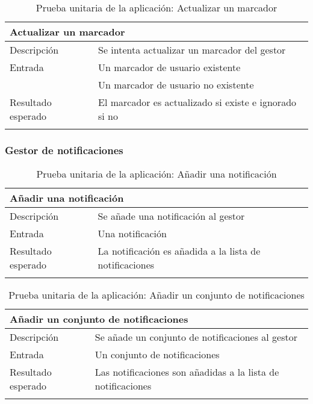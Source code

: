 \begin{longtable}{|p{} p{}|}
    \hline
    \multicolumn{2}{|l|}{\textbf{Actualizar un marcador}} \\ \hline 
    Descripción                 & Se intenta actualizar un marcador del gestor \\ \hline
    Entrada                     & Un marcador de usuario existente \\
                                & Un marcador de usuario no existente \\\hline
    Resultado esperado          & El marcador es actualizado si existe e ignorado si no \\ \hline
    \caption{Prueba unitaria de la aplicación: Actualizar un marcador}
    \label{cp:u:app:actualizar_marcador}
\end{longtable}
    
\vspace{-10pt}
\subsubsection{Gestor de notificaciones}

\begin{longtable}{|p{} p{}|}
    \hline
    \multicolumn{2}{|l|}{\textbf{Añadir una notificación}} \\ \hline 
    Descripción                 & Se añade una notificación al gestor \\ \hline
    Entrada                     & Una notificación \\ \hline
    Resultado esperado          & La notificación es añadida a la lista de notificaciones \\ \hline
    \caption{Prueba unitaria de la aplicación: Añadir una notificación}
    \label{cp:u:app:añadir_notificacion}
\end{longtable}

\vspace{-20pt}
\begin{longtable}{|p{} p{}|}
    \hline
    \multicolumn{2}{|l|}{\textbf{Añadir un conjunto de notificaciones}} \\ \hline 
    Descripción                 & Se añade un conjunto de notificaciones al gestor \\ \hline
    Entrada                     & Un conjunto de notificaciones \\ \hline
    Resultado esperado          & Las notificaciones son añadidas a la lista de notificaciones \\ \hline
    \caption{Prueba unitaria de la aplicación: Añadir un conjunto de notificaciones}
    \label{cp:u:app:añadir_conjunto_notificaciones}
\end{longtable}

